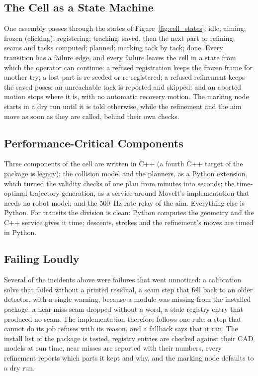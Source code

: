 \subsection{The Cell as a State Machine}
\label{sec:impl_states}
One assembly passes through the states of Figure~\ref{fig:cell_states}: idle; aiming; frozen (clicking);
registering; tracking; saved, then the next part or refining; seams and tacks computed; planned; marking
tack by tack; done. Every transition has a failure edge, and every failure leaves the cell in a state from
which the operator can continue: a refused registration keeps the frozen frame for another try; a lost
part is re-seeded or re-registered; a refused refinement keeps the saved poses; an unreachable tack is
reported and skipped; and an aborted motion stops where it is, with no automatic recovery motion. The
marking node starts in a dry run until it is told otherwise, while the refinement and the aim move as
soon as they are called, behind their own checks.

\subsection{Performance-Critical Components}
\label{sec:impl_cpp}
Three components of the cell are written in C++ (a fourth C++ target of the package is legacy): the
collision model and the planners, as a Python extension, which turned the validity checks of one plan
from minutes into seconds; the time-optimal trajectory generation, as a service around MoveIt's
implementation that needs no robot model; and the 500~Hz rate relay of the aim. Everything else is
Python. For transits the division is clean: Python computes the geometry and the C++ service gives it
time; descents, strokes and the refinement's moves are timed in Python.

\subsection{Failing Loudly}
\label{sec:impl_loud}
Several of the incidents above were failures that went unnoticed: a calibration solve that failed
without a printed residual, a seam step that fell back to an older detector, with a single warning,
because a module was missing from the installed package, a near-miss seam dropped without a word, a
stale registry entry that produced no seam. The implementation
therefore follows one rule: a step that cannot do its job refuses with its reason, and a fallback says
that it ran. The install list of the package is tested, registry entries are checked against their CAD
models at run time, near misses are reported with their numbers, every refinement reports which parts it
kept and why, and the marking node defaults to a dry run.

